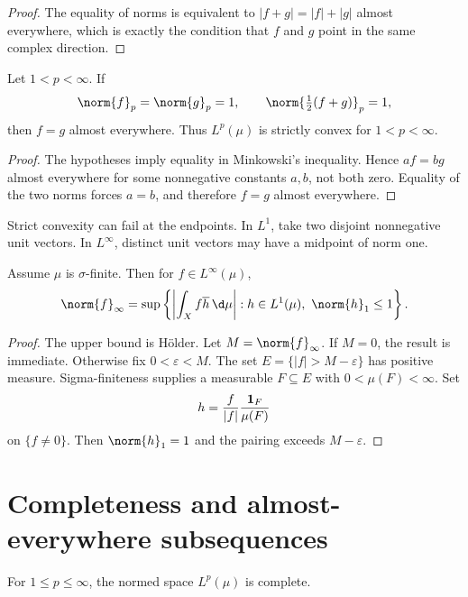 \begin{proof}
The equality of norms is equivalent to $|f+g|=|f|+|g|$ almost everywhere, which is exactly the condition that $f$ and $g$ point in the same complex direction.
\end{proof}

\begin{prop}
Let $1<p<\infty$. If
\[
\norm{f}_p=\norm{g}_p=1,
\qquad
\norm{\tfrac12(f+g)}_p=1,
\]
then $f=g$ almost everywhere. Thus $L^p(\mu)$ is strictly convex for $1<p<\infty$.
\end{prop}

\begin{proof}
The hypotheses imply equality in Minkowski's inequality. Hence $af=bg$ almost everywhere for some nonnegative constants $a,b$, not both zero. Equality of the two norms forces $a=b$, and therefore $f=g$ almost everywhere.
\end{proof}

\begin{remark}
Strict convexity can fail at the endpoints. In $L^1$, take two disjoint nonnegative unit vectors. In $L^\infty$, distinct unit vectors may have a midpoint of norm one.
\end{remark}

\begin{prop}
Assume $\mu$ is $\sigma$-finite. Then for $f\in L^\infty(\mu)$,
\[
\norm{f}_\infty
=\sup\left\{\left|\int_X f\overline h\,\d\mu\right|:
 h\in L^1(\mu),\ \norm{h}_1\leq1\right\}.
\]
\end{prop}

\begin{proof}
The upper bound is Hölder. Let $M=\norm{f}_\infty$. If $M=0$, the result is immediate. Otherwise fix $0<\varepsilon<M$. The set $E=\{|f|>M-\varepsilon\}$ has positive measure. Sigma-finiteness supplies a measurable $F\subseteq E$ with $0<\mu(F)<\infty$. Set
\[
h=\frac{f}{|f|}\frac{\mathbf{1}_F}{\mu(F)}
\]
on $\{f\neq0\}$. Then $\norm{h}_1=1$ and the pairing exceeds $M-\varepsilon$.
\end{proof}

\section{Completeness and almost-everywhere subsequences}

\begin{thm}[Completeness of $L^p$]
For $1\leq p\leq\infty$, the normed space $L^p(\mu)$ is complete.
\end{thm}

